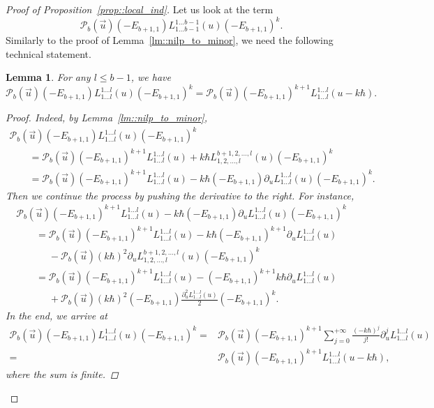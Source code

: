 \documentclass[10pt,a4paper]{article}
\numberwithin{equation}{section}
\newtheorem{Lemma}[Theorem]{Lemma}
\newcommand{\calP}{\mathcal{P}}
\begin{document}
\begin{proof}[Proof of Proposition~\ref{prop::local_ind}]
		Let us look at the term
		\[
		\calP_{b}(\vec{u})(-E_{b+1,1}) L_{1\dots b-1}^{1\dots b-1}(u) (-E_{b+1,1})^k.
		\]
		Similarly to the proof of Lemma~\ref{lm::nilp_to_minor}, we need the following technical statement.
		\begin{Lemma}
			\label{lm::gt_push_right_shift}
			For any $l\leq b-1$, we have
			\[
			\calP_{b}(\vec{u})(-E_{b+1,1}) L_{1\dots l}^{1\dots l}(u) (-E_{b+1,1})^k = \calP_{b}(\vec{u}) (-E_{b+1,1})^{k+1} L_{1\dots l}^{1\dots l}(u-k\hbar).
			\]
			\begin{proof}
				Indeed, by Lemma~\ref{lm::nilp_to_minor},
				\begin{gather*}
					\calP_{b}(\vec{u})(-E_{b+1,1}) L_{1\dots l}^{1\dots l}(u) (-E_{b+1,1})^k  \\
					\qquad= \calP_{b}(\vec{u})(-E_{b+1,1})^{k+1} L_{1\dots l}^{1\dots l}(u) + k\hbar L_{1,2,\dots,l}^{b+1,2,\dots,l}(u) (-E_{b+1,1})^{k} \\
					\qquad=\calP_{b}(\vec{u})(-E_{b+1,1})^{k+1} L_{1\dots l}^{1\dots l}(u) - k\hbar (-E_{b+1,1}) \partial_u L_{1\dots l}^{1\dots l}(u) (-E_{b+1,1})^k.
				\end{gather*}
				Then we continue the process by pushing the derivative to the right. For instance,
				\begin{gather*}
					\calP_{b}(\vec{u})(-E_{b+1,1})^{k+1} L_{1\dots l}^{1\dots l}(u) - k\hbar (-E_{b+1,1}) \partial_u L_{1\dots l}^{1\dots l}(u) (-E_{b+1,1})^k \\
					\qquad= \calP_{b}(\vec{u})(-E_{b+1,1})^{k+1} L_{1\dots l}^{1\dots l}(u) - k\hbar (-E_{b+1,1})^{k+1} \partial_u L_{1\dots l}^{1\dots l}(u) \\
					\phantom{\qquad=}{}- \calP_{b}(\vec{u})(k\hbar)^2 \partial_u L_{1,2,\dots,l}^{b+1,2,\dots,l}(u) (-E_{b+1,1})^k \\
					\qquad=\calP_{b}(\vec{u})(-E_{b+1,1})^{k+1} L_{1\dots l}^{1\dots l}(u) - (-E_{b+1,1})^{k+1} k\hbar \partial_u L_{1\dots l}^{1\dots l}(u) \\
					\phantom{\qquad=}{}+ \calP_{b}(\vec{u})(k\hbar)^2 (-E_{b+1,1}) \frac{\partial_u^2 L_{1\dots l}^{1\dots l}(u)}{2} (-E_{b+1,1})^k.
				\end{gather*}
				In the end, we arrive at
				\begin{align*}
					\calP_{b}(\vec{u})(-E_{b+1,1}) L_{1\dots l}^{1\dots l}(u) (-E_{b+1,1})^k
					={}&\calP_{b}(\vec{u}) (-E_{b+1,1})^{k+1} \sum\limits_{j=0}^{+\infty} \frac{(-k\hbar)^j}{j!} \partial_u^j L_{1\dots l}^{1\dots l}(u) \\
					={}&\calP_{b}(\vec{u}) (-E_{b+1,1})^{k+1} L_{1\dots l}^{1\dots l}(u-k\hbar),
				\end{align*}
				where the sum is finite.
			\end{proof}
		\end{Lemma}
		

\end{proof}
\end{document}
